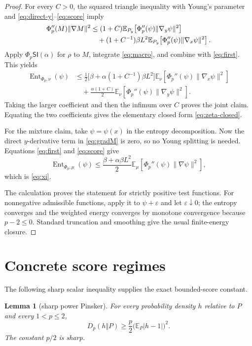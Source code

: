 \documentclass[11pt]{article}
\newtheorem{lemma}[theorem]{Lemma}
\theoremstyle{remark}
\newcommand{\E}{\mathbb E}
\newcommand{\Ent}{\operatorname{Ent}}
\newcommand{\norm}[1]{\lVert#1\rVert}
\newcommand{\phip}{\Phi_p}
\begin{document}
\begin{proof}
For every $C>0$, the squared triangle inequality with Young's parameter
and \eqref{eq:direct-y}--\eqref{eq:score} imply
\begin{align}
 \phip''(M)\norm{\nabla M}^2
 &\leq (1+C)\E_{P_y}\!\left[
 \phip''(\psi)\norm{\nabla_y\psi}^2\right]\notag\\
 &\quad +(1+C^{-1})\beta L^2\E_{P_y}\!\left[
 \phip''(\psi)\norm{\nabla_x\psi}^2\right].
 \label{eq:macro}
\end{align}
Apply $\Phi_p\mathsf{SI}(\alpha)$ for $\rho$ to $M$, integrate
\eqref{eq:macro}, and combine with \eqref{eq:first}.  This yields
\begin{align*}
 \Ent_{\phip,\nu}(\psi)
 &\leq\frac12\bigl[\beta+\alpha(1+C^{-1})\beta L^2\bigr]
 \E_\nu\!\left[\phip''(\psi)\norm{\nabla_x\psi}^2\right]\\
 &\quad+\frac{\alpha(1+C)}2
 \E_\nu\!\left[\phip''(\psi)\norm{\nabla_y\psi}^2\right].
\end{align*}
Taking the larger coefficient and then the infimum over $C$ proves the joint
claim.  Equating the two coefficients gives the elementary closed form
\eqref{eq:zeta-closed}.

For the mixture claim, take $\psi=\psi(x)$ in the entropy decomposition.
Now the direct $y$-derivative term in \eqref{eq:gradM} is zero, so no Young
splitting is needed.  Equations \eqref{eq:first} and \eqref{eq:score} give
\[
 \Ent_{\phip,\mu}(\psi)
 \leq \frac{\beta+\alpha\beta L^2}{2}
 \E_\mu\!\left[\phip''(\psi)\norm{\nabla\psi}^2\right],
\]
which is \eqref{eq:xi}.

The calculation proves the statement for strictly positive test functions.
For nonnegative admissible functions, apply it to $\psi+\varepsilon$ and let
$\varepsilon\downarrow0$; the entropy converges and the weighted energy
converges by monotone convergence because $p-2\leq0$.  Standard truncation
and smoothing give the usual finite-energy closure.
\end{proof}

\section{Concrete score regimes}

The following sharp scalar inequality supplies the exact bounded-score
constant.

\begin{lemma}[sharp power Pinsker]
\label{lem:pinsker}
For every probability density $h$ relative to $P$ and every $1<p\leq2$,
\begin{equation}
 D_p(h\Vert P)\geq \frac p2\bigl(\E_P|h-1|\bigr)^2.
 \label{eq:pinsker}
\end{equation}
The constant $p/2$ is sharp.
\end{lemma}
\end{document}
